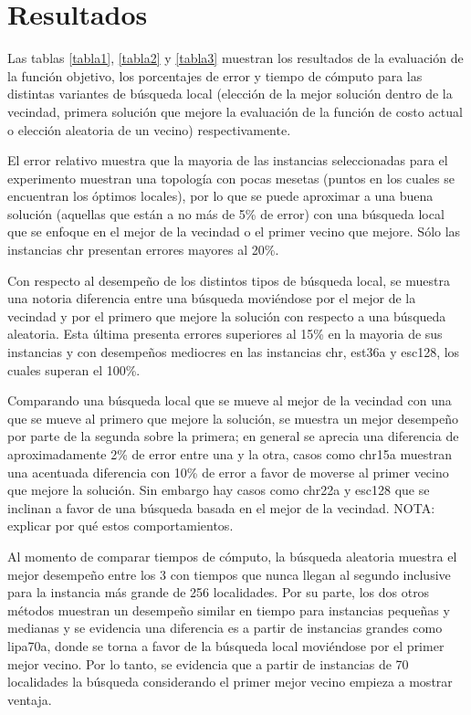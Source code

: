 \documentclass{ci5652}
\begin{document}
\section{Resultados}

Las tablas \ref{tabla1}, \ref{tabla2} y \ref{tabla3} muestran los resultados de la evaluación de la función objetivo, los porcentajes de error y tiempo de cómputo para las distintas variantes de búsqueda local (elección de la mejor solución dentro de la vecindad, primera solución que mejore la evaluación de la función de costo actual o elección aleatoria de un vecino) respectivamente.

El error relativo muestra que la mayoria de las instancias seleccionadas para el experimento muestran una topología con pocas mesetas (puntos en los cuales se encuentran los óptimos locales), por lo que se puede aproximar a una buena solución (aquellas que están a no más de 5\% de error) con una búsqueda local que se enfoque en el mejor de la vecindad o el primer vecino que mejore. Sólo las instancias chr presentan errores mayores al 20\%.

Con respecto al desempeño de los distintos tipos de búsqueda local, se muestra una notoria diferencia entre una búsqueda moviéndose por el mejor de la vecindad y por el primero que mejore la solución con respecto a una búsqueda aleatoria. Esta última presenta errores superiores al 15\% en la mayoria de sus instancias y con desempeños mediocres en las instancias chr, est36a y esc128, los cuales superan el 100\%.

Comparando una búsqueda local que se mueve al mejor de la vecindad con una que se mueve al primero que mejore la solución, se muestra un mejor desempeño por parte de la segunda sobre la primera; en general se aprecia una diferencia de aproximadamente 2\% de error entre una y la otra, casos como chr15a muestran una acentuada diferencia con 10\% de error a favor de moverse al primer vecino que mejore la solución. Sin embargo hay casos como chr22a y esc128 que se inclinan a favor de una búsqueda basada en el mejor de la vecindad. NOTA: explicar por qué estos comportamientos.

Al momento de comparar tiempos de cómputo, la búsqueda aleatoria muestra el mejor desempeño entre los 3 con tiempos que nunca llegan al segundo inclusive para la instancia más grande de 256 localidades. Por su parte, los dos otros métodos muestran un desempeño similar en tiempo para instancias pequeñas y medianas y se evidencia una diferencia es a partir de instancias grandes como lipa70a, donde se torna a favor de la búsqueda local moviéndose por el primer mejor vecino. Por lo tanto, se evidencia que a partir de instancias de 70 localidades la búsqueda considerando el primer mejor vecino empieza a mostrar ventaja.
\end{document}
